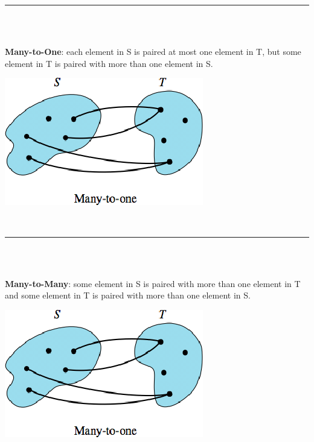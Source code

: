 \documentclass[12pt, letterpaper]{article}
\newcommand{\horizline}[0]{\noindent\rule{\textwidth}{1pt}\\}
\begin{document}
\horizline \\	
\begin{minipage}[t]{0.7\linewidth}
	\textbf{Many-to-One}: each element in S is paired at most one element in T, but some element in T is paired with more than one element in S.	
\end{minipage}
\begin{minipage}[t]{0.25\linewidth}
    \centering
    \strut\vspace*{-\baselineskip}\newline\includegraphics[width=\linewidth]{relations/manytoone.png} \smallbreak
\end{minipage}\\
\horizline \\
\begin{minipage}[t]{0.7\linewidth}
	\textbf{Many-to-Many}: some element in S is paired with more than one element in T and some element in T is paired with more than one element in S.	
\end{minipage}
\begin{minipage}[t]{0.25\linewidth}
    \centering
    \strut\vspace*{-\baselineskip}\newline\includegraphics[width=\linewidth]{relations/manytoone.png} \smallbreak
\end{minipage}\\
\end{document}
